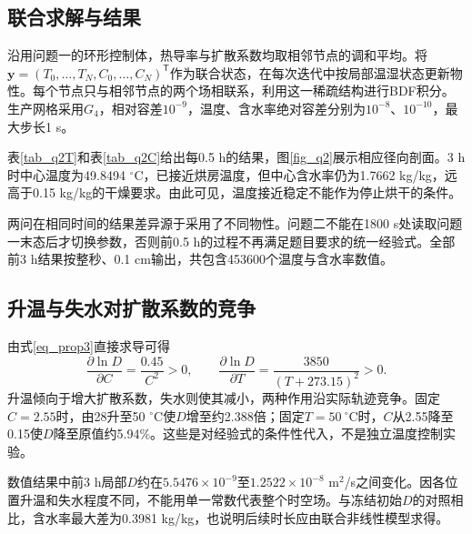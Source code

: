 \subsection{联合求解与结果}
沿用问题一的环形控制体，热导率与扩散系数均取相邻节点的调和平均。将$\boldsymbol y=(T_0,\ldots,T_N,C_0,\ldots,C_N)^{\mathsf T}$作为联合状态，在每次迭代中按局部温湿状态更新物性。每个节点只与相邻节点的两个场相联系，利用这一稀疏结构进行BDF积分。生产网格采用$G_4$，相对容差$10^{-9}$，温度、含水率绝对容差分别为$10^{-8}$、$10^{-10}$，最大步长1 s。

表\ref{tab_q2T}和表\ref{tab_q2C}给出每0.5 h的结果，图\ref{fig_q2}展示相应径向剖面。3 h时中心温度为49.8494 $^\circ$C，已接近烘房温度，但中心含水率仍为1.7662 kg/kg，远高于0.15 kg/kg的干燥要求。由此可见，温度接近稳定不能作为停止烘干的条件。



两问在相同时间的结果差异源于采用了不同物性。问题二不能在1800 s处读取问题一末态后才切换参数，否则前0.5 h的过程不再满足题目要求的统一经验式。全部前3 h结果按整秒、0.1 cm输出，共包含453600个温度与含水率数值。

\subsection{升温与失水对扩散系数的竞争}
由式\eqref{eq_prop3}直接求导可得
\begin{equation}\label{eq_logD}
\frac{\partial\ln D}{\partial C}=\frac{0.45}{C^2}>0,\qquad
\frac{\partial\ln D}{\partial T}=\frac{3850}{(T+273.15)^2}>0.
\end{equation}
升温倾向于增大扩散系数，失水则使其减小，两种作用沿实际轨迹竞争。固定$C=2.55$时，由28升至50 $^\circ$C使$D$增至约2.388倍；固定$T=50\ ^\circ$C时，$C$从2.55降至0.15使$D$降至原值约5.94\%。这些是对经验式的条件性代入，不是独立温度控制实验。

数值结果中前3 h局部$D$约在$5.5476\times10^{-9}$至$1.2522\times10^{-8}$ m$^2$/s之间变化。因各位置升温和失水程度不同，不能用单一常数代表整个时空场。与冻结初始$D$的对照相比，含水率最大差为0.3981 kg/kg，也说明后续时长应由联合非线性模型求得。
\FloatBarrier
